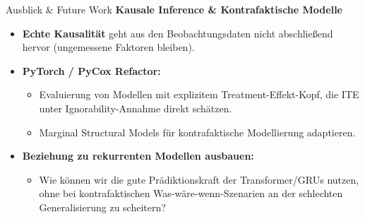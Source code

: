 \documentclass[12pt]{beamer}
\begin{document}
\begin{frame}{Ausblick \& Future Work}
    \small
    \textbf{Kausale Inference \& Kontrafaktische Modelle}
    \vspace{0.15cm}
    
    \begin{itemize}
        \item \textbf{Echte Kausalität} geht aus den Beobachtungsdaten nicht abschließend hervor (ungemessene Faktoren bleiben).
        \vspace{0.1cm}
        \item \textbf{PyTorch / PyCox Refactor:} 
        \begin{itemize}
            \item Evaluierung von Modellen mit explizitem Treatment-Effekt-Kopf, die ITE unter Ignorability-Annahme direkt schätzen.
	\item Marginal Structural Models für kontrafaktische Modellierung adaptieren.
        \end{itemize}
        \vspace{0.1cm}
        \item \textbf{Beziehung zu rekurrenten Modellen ausbauen:}
        \begin{itemize}
            \item Wie können wir die gute Prädiktionskraft der Transformer/GRUs nutzen, ohne bei kontrafaktischen Was-wäre-wenn-Szenarien an der schlechten Generalisierung zu scheitern? 
        \end{itemize}
    \end{itemize}
\end{frame}
\end{document}
